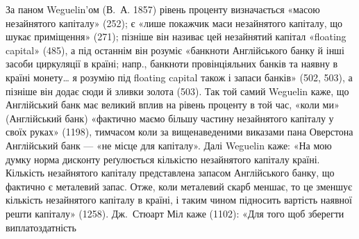 За паном Weguelin’ом (В.~А. 1857) рівень проценту визначається «масою
незайнятого капіталу» (252); є «лише покажчик маси незайнятого капіталу, що
шукає приміщення» (271); пізніше він називає цей незайнятий капітал «floating
capital» (485), а під останнім він розуміє «банкноти Англійського банку й інші
засоби циркуляції в країні; напр., банкноти провінціяльних банків та наявну в
країні монету\dots{} я розумію під floating capital також і запаси банків» (502, 503),
а пізніше він додає сюди й зливки золота (503). Так той самий Weguelin каже, що
Англійський банк має великий вплив на рівень проценту в той час, «коли ми» (Англійський
банк) «фактично маємо більшу частину незайнятого капіталу у своїх
руках» (1198), тимчасом коли за вищенаведеними виказами пана Оверстона Англійський
банк — «не місце для капіталу». Далі Weguelin каже: «На мою думку
норма дисконту реґулюється кількістю незайнятого капіталу країні. Кількість незайнятого
капіталу представлена запасом Англійського банку, що фактично є металевий
запас. Отже, коли металевий скарб меншає, то це зменшує кількість незайнятого
капіталу в країні, і таким чином підносить вартість наявної решти капіталу»
(1258). Дж.~Стюарт Міл каже (1102): «Для того щоб зберегти виплатоздатність
\parbreak{}  %
